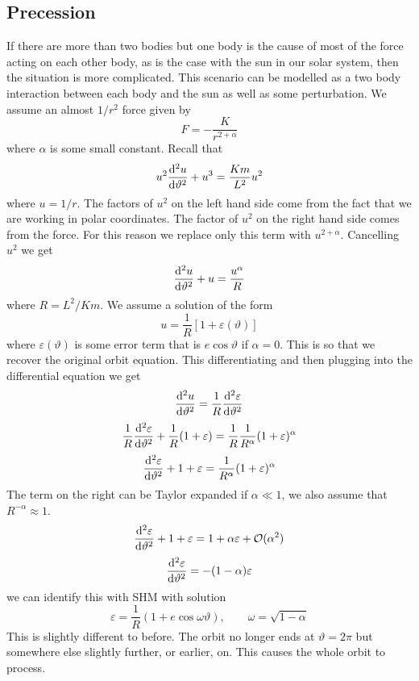 \documentclass{article}
\begin{document}
    \subsection{Precession}
    If there are more than two bodies but one body is the cause of most of the force acting on each other body, as is the case with the sun in our solar system, then the situation is more complicated.
    This scenario can be modelled as a two body interaction between each body and the sun as well as some perturbation.
    We assume an almost \(1/r^2\) force given by
    \[F = -\frac{K}{r^{2 + \alpha}}\]
    where \(\alpha\) is some small constant.
    Recall that
    \[u^2\dv[2]{u}{\vartheta} + u^3 = \frac{Km}{L^2}u^2\]
    where \(u = 1/r\).
    The factors of \(u^2\) on the left hand side come from the fact that we are working in polar coordinates.
    The factor of \(u^2\) on the right hand side comes from the force.
    For this reason we replace only this term with \(u^{2 + \alpha}\).
    Cancelling \(u^2\) we get
    \[\dv[2]{u}{\vartheta} + u = \frac{u^\alpha}{R}\]
    where \(R = L^2/Km\).
    We assume a solution of the form
    \[u = \frac{1}{R}[1 + \varepsilon(\vartheta)]\]
    where \(\varepsilon(\vartheta)\) is some error term that is \(e\cos\vartheta\) if \(\alpha = 0\).
    This is so that we recover the original orbit equation.
    This differentiating and then plugging into the differential equation we get
    \[\dv[2]{u}{\vartheta} = \frac{1}{R}\dv[2]{\varepsilon}{\vartheta}\]
    \[\frac{1}{R}\dv[2]{\varepsilon}{\vartheta} + \frac{1}{R}(1 + \varepsilon) = \frac{1}{R}\frac{1}{R^\alpha}(1 + \varepsilon)^\alpha\]
    \[\dv[2]{\varepsilon}{\vartheta} + 1 + \varepsilon = \frac{1}{R^\alpha}(1 + \varepsilon)^\alpha\]
    The term on the right can be Taylor expanded if \(\alpha\ll 1\), we also assume that \(R^{-\alpha}\approx 1\).
    \[\dv[2]{\varepsilon}{\vartheta} + 1 + \varepsilon = 1 + \alpha\varepsilon + \mathcal{O}(\alpha^2)\]
    \[\dv[2]{\varepsilon}{\vartheta} = -(1 - \alpha)\varepsilon\]
    we can identify this with SHM with solution
    \[\varepsilon = \frac{1}{R}(1 + e\cos\omega\vartheta),\qquad\omega = \sqrt{1 - \alpha}\]
    This is slightly different to before.
    The orbit no longer ends at \(\vartheta = 2\pi\) but somewhere else slightly further, or earlier, on.
    This causes the whole orbit to process.
    
\end{document}
